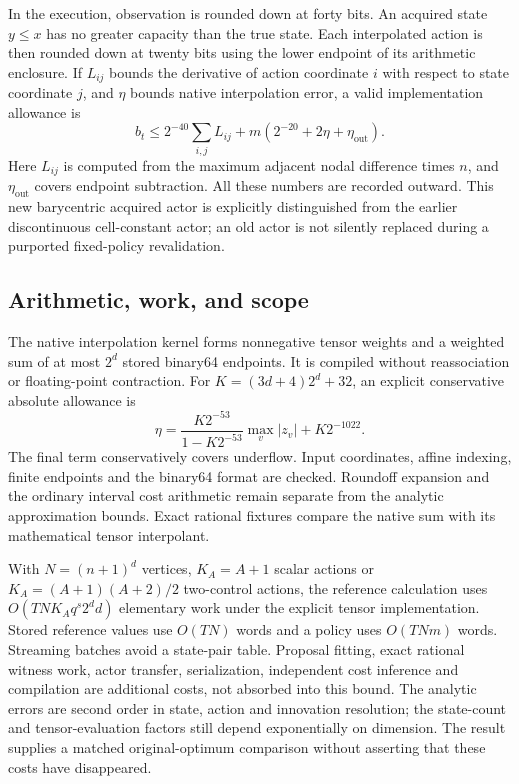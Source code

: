 In the execution, observation is rounded down at forty bits. An acquired state $y\le x$ has no greater capacity than the true state. Each interpolated action is then rounded down at twenty bits using the lower endpoint of its arithmetic enclosure. If $L_{ij}$ bounds the derivative of action coordinate $i$ with respect to state coordinate $j$, and $\eta$ bounds native interpolation error, a valid implementation allowance is
\[
 b_t\le 2^{-40}\sum_{i,j}L_{ij}
           +m(2^{-20}+2\eta+\eta_{\mathrm{out}}).
\]
Here $L_{ij}$ is computed from the maximum adjacent nodal difference times $n$, and $\eta_{\mathrm{out}}$ covers endpoint subtraction. All these numbers are recorded outward. This new barycentric acquired actor is explicitly distinguished from the earlier discontinuous cell-constant actor; an old actor is not silently replaced during a purported fixed-policy revalidation.

\subsection{Arithmetic, work, and scope}
The native interpolation kernel forms nonnegative tensor weights and a weighted sum of at most $2^d$ stored binary64 endpoints. It is compiled without reassociation or floating-point contraction. For $K=(3d+4)2^d+32$, an explicit conservative absolute allowance is
\[
 \eta=\frac{K2^{-53}}{1-K2^{-53}}\max_v|z_v|+K2^{-1022}.
\]
The final term conservatively covers underflow. Input coordinates, affine indexing, finite endpoints and the binary64 format are checked. Roundoff expansion and the ordinary interval cost arithmetic remain separate from the analytic approximation bounds. Exact rational fixtures compare the native sum with its mathematical tensor interpolant.

With $N=(n+1)^d$ vertices, $K_A=A+1$ scalar actions or $K_A=(A+1)(A+2)/2$ two-control actions, the reference calculation uses $O(TNK_Aq^s2^d d)$ elementary work under the explicit tensor implementation. Stored reference values use $O(TN)$ words and a policy uses $O(TNm)$ words. Streaming batches avoid a state-pair table. Proposal fitting, exact rational witness work, actor transfer, serialization, independent cost inference and compilation are additional costs, not absorbed into this bound. The analytic errors are second order in state, action and innovation resolution; the state-count and tensor-evaluation factors still depend exponentially on dimension. The result supplies a matched original-optimum comparison without asserting that these costs have disappeared.
